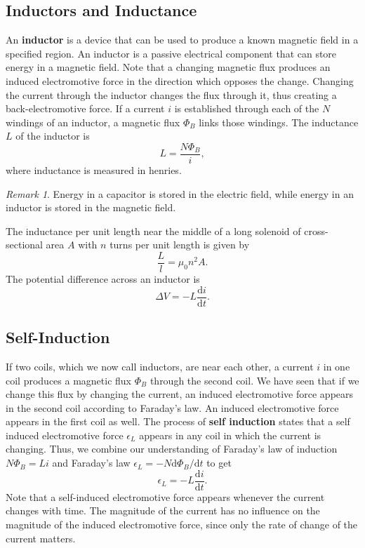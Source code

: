 \documentclass[11pt]{article}
\theoremstyle{plain} %
\theoremstyle{definition}
\theoremstyle{example}
\theoremstyle{remark}
\newtheorem*{remark}{Remark}
\begin{document}
\subsection{Inductors and Inductance}
An \textbf{inductor} is a device that can be used to produce a known magnetic field in a specified region. An inductor is a passive electrical component that can store energy in a magnetic field. Note that a changing magnetic flux produces an induced electromotive force in the direction which opposes the change. Changing the current through the inductor changes the flux through it, thus creating a back-electromotive force. If a current $i$ is established through each of the $N$ windings of an inductor, a magnetic flux $\Phi_B$ links those windings. The inductance $L$ of the inductor is 
$$L = \frac{N\Phi_B}{i},$$
where inductance is measured in henries. 
\begin{remark}
Energy in a capacitor is stored in the electric field, while energy in an inductor is stored in the magnetic field. 
\end{remark}
The inductance per unit length near the middle of a long solenoid of cross-sectional area $A$ with $n$ turns per unit length is given by 
$$\frac{L}{l} = \mu_0n^2A.$$
The potential difference across an inductor is 
$$\Delta V = -L\frac{\mathrm d i}{\mathrm d t}.$$

\subsection{Self-Induction}
If two coils, which we now call inductors, are near each other, a current $i$ in one coil produces a magnetic flux $\Phi_B$ through the second coil. We have seen that if we change this flux by changing the current, an induced electromotive force appears in the second coil according to Faraday's law. An induced electromotive force appears in the first coil as well. The process of \textbf{self induction} states that a self induced electromotive force $\epsilon_L$
appears in any coil in which the current is changing. 
Thus, we combine our understanding of Faraday's law of induction $N\Phi_B = Li$ and Faraday's law $\epsilon_L = -N\mathrm d \Phi_B/\mathrm d t$ to get 
$$\epsilon_L = -L\frac{\mathrm d i}{\mathrm d t}.$$
Note that a self-induced electromotive force appears whenever the current changes with time. The magnitude of the current has no influence on the magnitude of the induced electromotive force, since only the rate of change of the current matters. 
\end{document}
